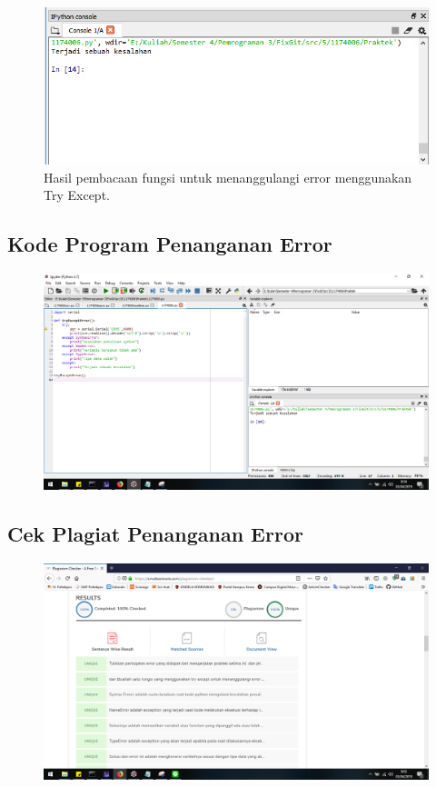 \begin{figure}[H]
	\includegraphics[width=12cm]{figures/5/1174017/Praktek/5.png}
	\centering
	\caption{Hasil pembacaan fungsi untuk menanggulangi error menggunakan Try Except.}
\end{figure}

\subsection{Kode Program Penanganan Error}
\begin{figure}[H]
	\includegraphics[width=12cm]{figures/5/1174017/Praktek/error.png}
	\centering
\end{figure}

\subsection{Cek Plagiat Penanganan Error}
\begin{figure}[H]
	\includegraphics[width=12cm]{figures/5/1174017/Praktek/plagiat_error.png}
	\centering
\end{figure}

